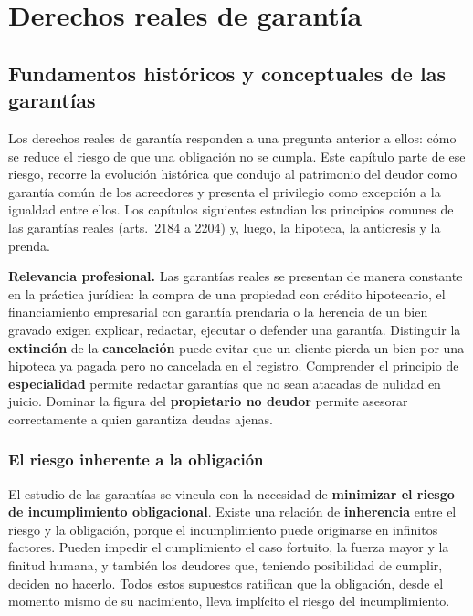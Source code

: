 \documentclass[12pt,oneside]{book}
\begin{document}


\part{Derechos reales de garantía}

\chapter{Fundamentos históricos y conceptuales de las garantías}\label{cap:garantias-fund}

Los derechos reales de garantía responden a una pregunta anterior a ellos: cómo se reduce el riesgo de que una obligación no se cumpla. Este capítulo parte de ese riesgo, recorre la evolución histórica que condujo al patrimonio del deudor como garantía común de los acreedores y presenta el privilegio como excepción a la igualdad entre ellos. Los capítulos siguientes estudian los principios comunes de las garantías reales (arts.~2184 a 2204) y, luego, la hipoteca, la anticresis y la prenda.

\begin{nota}
\textbf{Relevancia profesional.} Las garantías reales se presentan de manera constante en la práctica jurídica: la compra de una propiedad con crédito hipotecario, el financiamiento empresarial con garantía prendaria o la herencia de un bien gravado exigen explicar, redactar, ejecutar o defender una garantía. Distinguir la \textbf{extinción} de la \textbf{cancelación} puede evitar que un cliente pierda un bien por una hipoteca ya pagada pero no cancelada en el registro. Comprender el principio de \textbf{especialidad} permite redactar garantías que no sean atacadas de nulidad en juicio. Dominar la figura del \textbf{propietario no deudor} permite asesorar correctamente a quien garantiza deudas ajenas.
\end{nota}

\section{El riesgo inherente a la obligación}

El estudio de las garantías se vincula con la necesidad de \textbf{minimizar el riesgo de incumplimiento obligacional}. Existe una relación de \textbf{inherencia} entre el riesgo y la obligación, porque el incumplimiento puede originarse en infinitos factores. Pueden impedir el cumplimiento el caso fortuito, la fuerza mayor y la finitud humana, y también los deudores que, teniendo posibilidad de cumplir, deciden no hacerlo. Todos estos supuestos ratifican que la obligación, desde el momento mismo de su nacimiento, lleva implícito el riesgo del incumplimiento.
\end{document}
